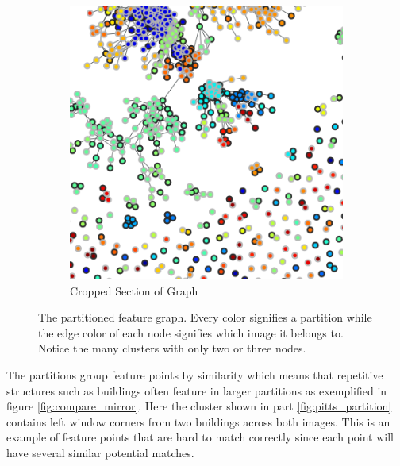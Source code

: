 \documentclass[12pt,journal,compsoc]{IEEEtran}
\begin{document}
\begin{figure}
{\begin{subfigure}[t]{0.3\textwidth}
			\includegraphics[width=\textwidth]{images/MMC_graph_cropped}
			\caption{Cropped Section of Graph}
			\label{fig:cropped_graph}
		\end{subfigure}%
	}%
	\caption{The partitioned feature graph. Every color signifies a 
	partition while the edge color of each node signifies which image it 
belongs to. Notice the many clusters with only two or three nodes.}
	\label{fig:graph}
\end{figure}
%
The partitions group feature points by similarity which means that 
repetitive structures such as buildings often feature in larger 
partitions as exemplified in figure \ref{fig:compare_mirror}. Here the 
cluster shown in part \ref{fig:pitts_partition} contains left window 
corners from two buildings across both images. This is an example of 
feature points that are hard to match correctly since each point will 
have several similar potential matches.
%
\end{document}
